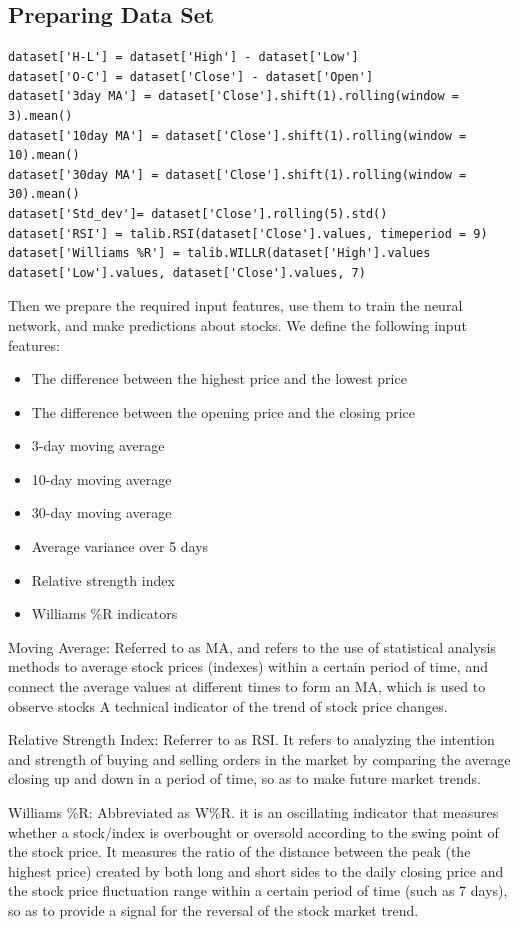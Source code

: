 \documentclass{article}
\begin{document}
\subsection{Preparing Data Set}
\begin{verbatim}
dataset['H-L'] = dataset['High'] - dataset['Low']
dataset['O-C'] = dataset['Close'] - dataset['Open']
dataset['3day MA'] = dataset['Close'].shift(1).rolling(window = 3).mean()
dataset['10day MA'] = dataset['Close'].shift(1).rolling(window = 10).mean()
dataset['30day MA'] = dataset['Close'].shift(1).rolling(window = 30).mean()
dataset['Std_dev']= dataset['Close'].rolling(5).std()
dataset['RSI'] = talib.RSI(dataset['Close'].values, timeperiod = 9)
dataset['Williams %R'] = talib.WILLR(dataset['High'].values
dataset['Low'].values, dataset['Close'].values, 7)
\end{verbatim}
Then we prepare the required input features, use them to train the neural network, and make predictions about stocks. We define the following input features:
\begin{itemize}
    \item The difference between the highest price and the lowest price
    \item The difference between the opening price and the closing price
    \item 3-day moving average
    \item 10-day moving average
    \item 30-day moving average
    \item Average variance over 5 days
    \item Relative strength index
    \item Williams \%R indicators
\end{itemize}
Moving Average: Referred to as MA, and refers to the use of statistical analysis methods to average stock prices (indexes) within a certain period of time, and connect the average values at different times to form an MA, which is used to observe stocks A technical indicator of the trend of stock price changes.

Relative Strength Index: Referrer to as RSI. It refers to analyzing the intention and strength of buying and selling orders in the market by comparing the average closing up and down in a period of time, so as to make future market trends.

Williams \%R: Abbreviated as W\%R. it is an oscillating indicator that measures whether a stock/index is overbought or oversold according to the swing point of the stock price. It measures the ratio of the distance between the peak (the highest price) created by both long and short sides to the daily closing price and the stock price fluctuation range within a certain period of time (such as 7 days), so as to provide a signal for the reversal of the stock market trend.
\end{document}
